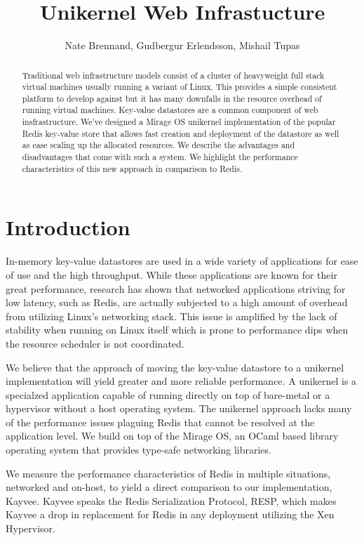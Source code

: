 \documentclass[english,10pt,twocolumn]{article}
\begin{document}
\title{Unikernel Web Infrastucture}
\author{Nate Brennand, Gudbergur Erlendsson, Mishail Tupas}
\date{}
\maketitle
\thispagestyle{empty}

\begin{abstract}
Traditional web infrastructure models consist of a cluster of heavyweight full stack virtual machines usually running a variant of Linux.
This provides a simple consistent platform to develop against but it has many downfalls in the resource overhead of running virtual machines.
Key-value datastores are a common component of web insfrastructure.
We've designed a Mirage OS\cite{mirage} unikernel implementation of the popular Redis\cite{redis} key-value store that allows fast creation and deployment of the datastore as well as ease scaling up the allocated resources.
We describe the advantages and disadvantages that come with such a system.
We highlight the performance characteristics of this new approach in comparison to Redis.
\end{abstract}

\section{Introduction}
In-memory key-value datastores are used in a wide variety of applications for ease of use and the high throughput.
While these applications are known for their great performance, research has shown that networked applications striving for low latency, such as Redis, are actually subjected to a high amount of overhead from utilizing Linux's networking stack.\cite{arrakis}
This issue is amplified by the lack of stability when running on Linux itself which is prone to performance dips when the resource scheduler is not coordinated.

We believe that the approach of moving the key-value datastore to a unikernel implementation will yield greater and more reliable performance.
A unikernel is a specialzed application capable of running directly on top of bare-metal or a hypervisor without a host operating system.
The unikernel approach lacks many of the performance issues plaguing Redis that cannot be resolved at the application level.
We build on top of the Mirage OS\cite{mirage}, an OCaml based library operating system that provides type-safe networking libraries.

We measure the performance characteristics of Redis in multiple situations, networked and on-host, to yield a direct comparison to our implementation, Kayvee.
Kayvee speaks the Redis Serialization Protocol\cite{redis-protocol}, RESP, which makes Kayvee a drop in replacement for Redis in any deployment utilizing the Xen Hypervisor.
\end{document}
